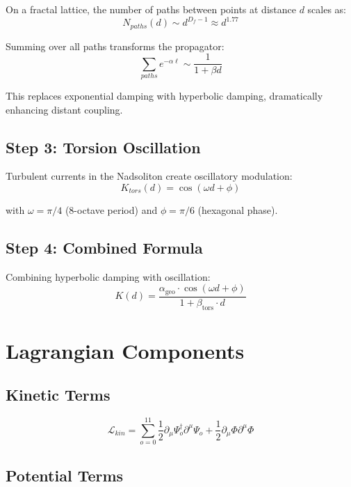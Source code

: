 \documentclass[11pt,a4paper]{book}
\theoremstyle{remark}
\newcommand{\alphageo}{\alpha_{\text{geo}}}
\newcommand{\betators}{\beta_{\text{tors}}}
\begin{document}
On a fractal lattice, the number of paths between points at distance $d$ scales as:
\begin{equation}
N_{paths}(d) \sim d^{D_f - 1} \approx d^{1.77}
\end{equation}

Summing over all paths transforms the propagator:
\begin{equation}
\sum_{paths} e^{-\alpha \ell} \sim \frac{1}{1 + \beta d}
\end{equation}

This replaces exponential damping with hyperbolic damping, dramatically enhancing distant coupling.

\subsection{Step 3: Torsion Oscillation}

Turbulent currents in the Nadsoliton create oscillatory modulation:
\begin{equation}
K_{tors}(d) = \cos(\omega d + \phi)
\end{equation}

with $\omega = \pi/4$ (8-octave period) and $\phi = \pi/6$ (hexagonal phase).

\subsection{Step 4: Combined Formula}

Combining hyperbolic damping with oscillation:
\begin{equation}
\boxed{K(d) = \frac{\alphageo \cdot \cos(\omega d + \phi)}{1 + \betators \cdot d}}
\end{equation}

\section{Lagrangian Components}

\subsection{Kinetic Terms}

\begin{equation}
\mathcal{L}_{kin} = \sum_{o=0}^{11} \frac{1}{2} \partial_\mu \Psi_o^\dagger \partial^\mu \Psi_o + \frac{1}{2} \partial_\mu \Phi \partial^\mu \Phi
\end{equation}

\subsection{Potential Terms}
\end{document}
